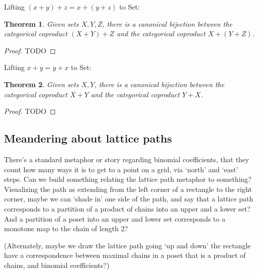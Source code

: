 \documentclass{proc-l}
\newtheorem{theorem}{Theorem}[section]
\theoremstyle{definition}
\theoremstyle{remark}
\numberwithin{equation}{section}
\begin{document}

Lifting \((x + y) + z = x + (y + z)\) to Set:

\begin{theorem}
Given sets \(X, Y, Z\), there is a canonical bijection between the categorical coproduct \((X + Y) + Z\) and the categorical coproduct \(X + (Y + Z)\).
\end{theorem}

\begin{proof}
TODO
\end{proof} 


Lifting \(x + y = y + x\) to Set:

\begin{theorem}
Given sets \(X, Y\), there is a canonical bijection between the categorical coproduct \(X + Y\) and the categorical coproduct \(Y + X\).
\end{theorem}

\begin{proof}
TODO
\end{proof}

\subsection{Meandering about lattice paths}

There's a standard metaphor or story regarding binomial coefficients, that they count how many ways it is to get to a point on a grid, via `north' and `east' steps. Can we build something relating the lattice path metaphor to something? Visualizing the path as extending from the left corner of a rectangle to the right corner, maybe we can `shade in' one side of the path, and say that a lattice path corresponds to a partition of a product of chains into an upper and a lower set? And a partition of a poset into an upper and lower set corresponds to a monotone map to the chain of length 2? 

(Alternately, maybe we draw the lattice path going `up and down' the rectangle have a correspondence between maximal chains in a poset that is a product of chains, and binomial coefficients?)
\end{document}

